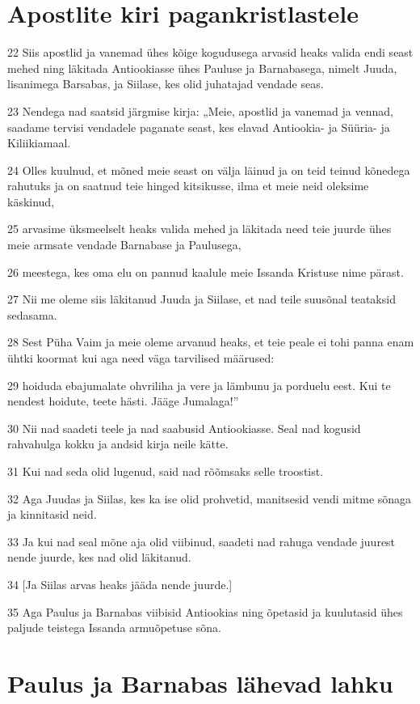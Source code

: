 \section*{Apostlite kiri pagankristlastele}

\par 22 Siis apostlid ja vanemad ühes kõige kogudusega arvasid heaks valida endi seast mehed ning läkitada Antiookiasse ühes Pauluse ja Barnabasega, nimelt Juuda, lisanimega Barsabas, ja Siilase, kes olid juhatajad vendade seas.
\par 23 Nendega nad saatsid järgmise kirja: „Meie, apostlid ja vanemad ja vennad, saadame tervisi vendadele paganate seast, kes elavad Antiookia- ja Süüria- ja Kiliikiamaal.
\par 24 Olles kuulnud, et mõned meie seast on välja läinud ja on teid teinud kõnedega rahutuks ja on saatnud teie hinged kitsikusse, ilma et meie neid oleksime käskinud,
\par 25 arvasime üksmeelselt heaks valida mehed ja läkitada need teie juurde ühes meie armsate vendade Barnabase ja Paulusega,
\par 26 meestega, kes oma elu on pannud kaalule meie Issanda Kristuse nime pärast.
\par 27 Nii me oleme siis läkitanud Juuda ja Siilase, et nad teile suusõnal teataksid sedasama.
\par 28 Sest Püha Vaim ja meie oleme arvanud heaks, et teie peale ei tohi panna enam ühtki koormat kui aga need väga tarvilised määrused:
\par 29 hoiduda ebajumalate ohvriliha ja vere ja lämbunu ja porduelu eest. Kui te nendest hoidute, teete hästi. Jääge Jumalaga!”
\par 30 Nii nad saadeti teele ja nad saabusid Antiookiasse. Seal nad kogusid rahvahulga kokku ja andsid kirja neile kätte.
\par 31 Kui nad seda olid lugenud, said nad rõõmsaks selle troostist.
\par 32 Aga Juudas ja Siilas, kes ka ise olid prohvetid, manitsesid vendi mitme sõnaga ja kinnitasid neid.
\par 33 Ja kui nad seal mõne aja olid viibinud, saadeti nad rahuga vendade juurest nende juurde, kes nad olid läkitanud.
\par 34 [Ja Siilas arvas heaks jääda nende juurde.]
\par 35 Aga Paulus ja Barnabas viibisid Antiookias ning õpetasid ja kuulutasid ühes paljude teistega Issanda armuõpetuse sõna.

\section*{Paulus ja Barnabas lähevad lahku}

